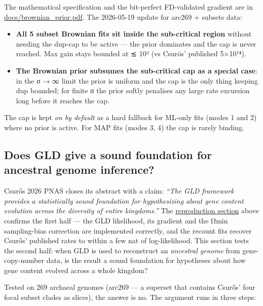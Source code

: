 \documentclass[
  10pt,
]{article}
\providecommand{\tightlist}{%
  \setlength{\itemsep}{0pt}\setlength{\parskip}{0pt}}
\begin{document}
The mathematical specification and the bit-perfect FD-validated gradient
are in \url{docs/brownian_prior.pdf}. The 2026-05-19 update for arc269 +
subsets data:

\begin{itemize}
\tightlist
\item
  \textbf{All 5 subset Brownian fits sit inside the sub-critical region}
  without needing the dup-cap to be active --- the prior dominates and
  the cap is never reached. Max gain stays bounded at ≲ 10² (vs Csurös'
  published 5×10¹⁴).
\item
  \textbf{The Brownian prior subsumes the sub-critical cap as a special
  case}: in the σ → ∞ limit the prior is uniform and the cap is the only
  thing keeping dup bounded; for finite σ the prior softly penalises any
  large rate excursion long before it reaches the cap.
\end{itemize}

The cap is kept \emph{on by default} as a hard fallback for ML-only fits
(modes 1 and 2) where no prior is active. For MAP fits (modes 3, 4) the
cap is rarely binding.

\subsection{Does GLD give a sound foundation for ancestral genome
inference?}\label{does-gld-give-a-sound-foundation-for-ancestral-genome-inference}

Csurős 2026 PNAS closes its abstract with a claim: \emph{``The GLD
framework provides a statistically sound foundation for hypothesizing
about gene content evolution across the diversity of entire kingdoms.''}
The \hyperref[demonstration-of-reproduction]{reproduction section} above
confirms the first half --- the GLD likelihood, its gradient and the
Ωmin sampling-bias correction are implemented correctly, and the recount
fits recover Csurős' published rates to within a few nat of
log-likelihood. This section tests the second half: when GLD is used to
reconstruct an \emph{ancestral genome} from gene-copy-number data, is
the result a sound foundation for hypotheses about how gene content
evolved across a whole kingdom?

Tested on 269 archaeal genomes (arc269 --- a superset that contains
Csurős' four focal subset clades as slices), the answer is no. The
argument runs in three steps:
\end{document}
